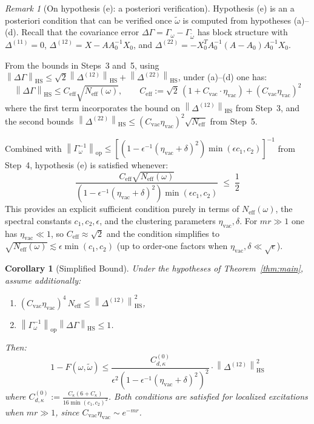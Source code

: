 \documentclass[11pt,a4paper]{article}
\theoremstyle{plain}
\newtheorem{corollary}[theorem]{Corollary}
\theoremstyle{definition}
\theoremstyle{remark}
\newtheorem{remark}[theorem]{Remark}
\newcommand{\opnorm}[1]{\left\lVert #1 \right\rVert_{\mathrm{op}}}
\newcommand{\hsnorm}[1]{\left\lVert #1 \right\rVert_{\mathrm{HS}}}
\newcommand{\etavac}{\eta_{\mathrm{vac}}}
\newcommand{\Cvac}{C_{\mathrm{vac}}}
\newcommand{\Neff}{N_{\mathrm{eff}}}
\newcommand{\Ckappa}{C_{\kappa}}
\newcommand{\Cd}{C^{(0)}_{d,\kappa}}
\begin{document}
\begin{remark}[On hypothesis (e): a posteriori verification]\label{rem:hype}
Hypothesis (e) is an a posteriori condition that can be verified once
$\tilde{\omega}$ is computed from hypotheses (a)--(d). Recall that the covariance
error $\Delta\Gamma = \Gamma_\omega - \Gamma_{\tilde{\omega}}$ has block structure
with $\Delta^{(11)} = 0$, $\Delta^{(12)} = X - A A_0^{-1} X_0$, and
$\Delta^{(22)} = -X_0^T A_0^{-1}(A - A_0)A_0^{-1} X_0$.

From the bounds in Steps~3 and~5, using
$\hsnorm{\Delta\Gamma} \le \sqrt{2}\hsnorm{\Delta^{(12)}} + \hsnorm{\Delta^{(22)}}$,
under (a)--(d) one has:
\begin{equation}
\hsnorm{\Delta\Gamma} \le C_{\mathrm{eff}}\sqrt{\Neff(\omega)}, \qquad
C_{\mathrm{eff}} := \sqrt{2}\,(1 + \Cvac \cdot \etavac) + (\Cvac\etavac)^2
\end{equation}
where the first term incorporates the bound on $\hsnorm{\Delta^{(12)}}$ from
Step~3, and the second bounds
$\hsnorm{\Delta^{(22)}} \le (\Cvac\etavac)^2\sqrt{\Neff}$ from Step~5.

Combined with
$\opnorm{\Gamma_\omega^{-1}} \le
[(1 - \epsilon^{-1}(\etavac+\delta)^2)\min(\epsilon c_1, c_2)]^{-1}$ from Step~4,
hypothesis (e) is satisfied whenever:
\begin{equation}
\frac{C_{\mathrm{eff}}\sqrt{\Neff(\omega)}}
{\left(1 - \epsilon^{-1}(\etavac + \delta)^2\right)\min(\epsilon c_1, c_2)}
\;\le\; \frac{1}{2}
\end{equation}
This provides an explicit sufficient condition purely in terms of $\Neff(\omega)$,
the spectral constants $c_1, c_2, \epsilon$, and the clustering parameters
$\etavac, \delta$. For $mr \gg 1$ one has $\etavac \ll 1$, so
$C_{\mathrm{eff}} \approx \sqrt{2}$ and the condition simplifies to
$\sqrt{\Neff(\omega)} \lesssim \epsilon \min(c_1, c_2)$ (up to order-one factors
when $\etavac, \delta \ll \sqrt{\epsilon}$).
\end{remark}

\begin{corollary}[Simplified Bound]\label{cor:simplified}
Under the hypotheses of Theorem~\ref{thm:main}, assume additionally:
\begin{enumerate}
\item[(i)] $(\Cvac\etavac)^4\, \Neff \le \hsnorm{\Delta^{(12)}}^2$,
\item[(ii)] $\opnorm{\Gamma_\omega^{-1}}\hsnorm{\Delta\Gamma} \le 1$.
\end{enumerate}
Then:
\begin{equation}
1 - F(\omega, \tilde{\omega}) \le
\frac{\Cd}{\epsilon^2\left(1 - \epsilon^{-1}(\etavac + \delta)^2\right)^2}
\cdot \hsnorm{\Delta^{(12)}}^2
\end{equation}
where $\Cd := \frac{\Ckappa(6+\Ckappa)}{16\min(c_1,c_2)^2}$. Both conditions are
satisfied for localized excitations when $mr \gg 1$, since
$\Cvac\etavac \sim e^{-mr}$.
\end{corollary}
\end{document}
